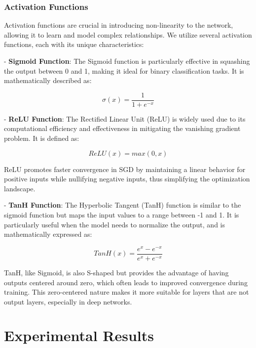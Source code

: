 \documentclass{article}
\begin{document}
\subsubsection{Activation Functions}

Activation functions are crucial in introducing non-linearity to the network, allowing it to learn and model complex relationships. We utilize several activation functions, each with its unique characteristics:

- \textbf{Sigmoid Function}: The Sigmoid function is particularly effective in squashing the output between 0 and 1, making it ideal for binary classification tasks. It is mathematically described as:

\begin{equation}
    \sigma(x) = \frac{1}{1 + e^{-x}}
\end{equation}

- \textbf{ReLU Function}: The Rectified Linear Unit (ReLU) is widely used due to its computational efficiency and effectiveness in mitigating the vanishing gradient problem. It is defined as:

\begin{equation}
    ReLU(x) = max(0, x)
\end{equation}

ReLU promotes faster convergence in SGD by maintaining a linear behavior for positive inputs while nullifying negative inputs, thus simplifying the optimization landscape.

- \textbf{TanH Function}: The Hyperbolic Tangent (TanH) function is similar to the sigmoid function but maps the input values to a range between -1 and 1. It is particularly useful when the model needs to normalize the output, and is mathematically expressed as:

\begin{equation}
    TanH(x) = \frac{e^{x} - e^{-x}}{e^{x} + e^{-x}}
\end{equation}

TanH, like Sigmoid, is also S-shaped but provides the advantage of having outputs centered around zero, which often leads to improved convergence during training. This zero-centered nature makes it more suitable for layers that are not output layers, especially in deep networks.


\section{Experimental Results}
\end{document}
